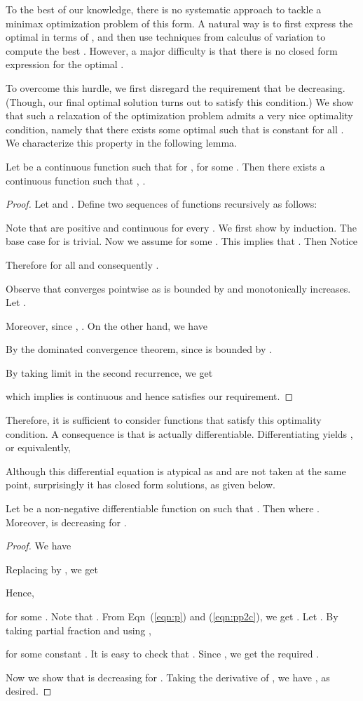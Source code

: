 \documentclass{article}
\begin{document}
To the best of our knowledge, there is no systematic approach to tackle a minimax optimization problem of this form. A natural way is to first express the optimal  in terms of , and then use techniques from calculus of variation to compute the best . However, a major difficulty is that there is no closed form expression for the optimal . 

To overcome this hurdle, we first disregard the requirement that  be decreasing. (Though, our final optimal solution turns out to satisfy this condition.) We show that such a relaxation of the optimization problem admits a very nice optimality condition, namely that there exists some optimal  such that  is constant for all . We characterize this property in the following lemma.
\begin{lemma}
Let  be a
continuous function such that for , 
for some . Then there exists a continuous function 
such that , .
\end{lemma}
\begin{proof}
Let  and .
Define two sequences of functions  recursively
as follows:


Note that  are positive and continuous for every . We first show  by induction. The base case for  is trivial. Now we assume  for some . This implies that .  Then
Notice 

Therefore  for all  and consequently .

Observe that  converges pointwise as
 is bounded by  and monotonically increases. Let . 

Moreover, since , .
On the other hand, we have

By the dominated convergence theorem, 
since  is bounded by . 

By taking limit in the second recurrence, we get

which implies  is  continuous and hence satisfies our requirement.
\end{proof}


Therefore, it is sufficient to consider functions  that satisfy this optimality condition. A consequence is that  is actually differentiable. Differentiating  yields , or equivalently, 

Although this differential equation is atypical as  and  are not taken at the same point, surprisingly it has closed form solutions, as given below.
\begin{lemma}
Let  be a non-negative differentiable function on  such that . Then where . Moreover,  is decreasing for .
\end{lemma}
\begin{proof}
We have 

Replacing  by , we get 


Hence,


for some . Note that . 
From Eqn~(\ref{eqn:p}) and (\ref{eqn:pp2c}), we get .
Let . By taking partial fraction and using ,

for some constant . It is easy to check that . Since , we get the required .

Now we show that
 is decreasing for . Taking the derivative of , we have ,
as desired.
\end{proof}
\end{document}
